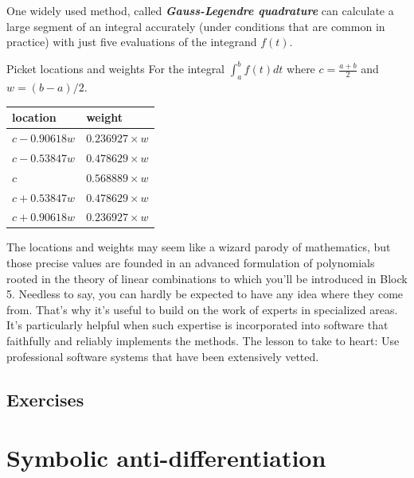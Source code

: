 \documentclass[
  letterpaper,
  DIV=11,
  numbers=noendperiod,
  oneside]{scrreprt}
\begin{document}
One widely used method, called \textbf{\emph{Gauss-Legendre quadrature}}
can calculate a large segment of an integral accurately (under
conditions that are common in practice) with just five evaluations of
the integrand \(f(t)\).

\begin{margintable}

\caption{Picket locations and weights For the integral
\(\int_a^b f(t) dt\) where \(c = \frac{a+b}{2}\) and
\(w = (b-a)/2\).}\begin{minipage}[t]{\linewidth}

{\centering 

\begin{longtable}[]{@{}ll@{}}
\toprule
location & weight \\
\midrule
\endhead
\(c - 0.90618 w\) & \(0.236927 \times w\) \\
\(c - 0.53847 w\) & \(0.478629 \times w\) \\
\(c\) & \(0.568889 \times w\) \\
\(c + 0.53847 w\) & \(0.478629 \times w\) \\
\(c + 0.90618 w\) & \(0.236927 \times w\) \\
\bottomrule
\end{longtable}

}

\end{minipage}%

\end{margintable}

The locations and weights may seem like a wizard parody of mathematics,
but those precise values are founded in an advanced formulation of
polynomials rooted in the theory of linear combinations to which you'll
be introduced in Block 5. Needless to say, you can hardly be expected to
have any idea where they come from. That's why it's useful to build on
the work of experts in specialized areas. It's particularly helpful when
such expertise is incorporated into software that faithfully and
reliably implements the methods. The lesson to take to heart: Use
professional software systems that have been extensively vetted.

\hypertarget{exercises-3}{%
\section{Exercises}\label{exercises-3}}

\hypertarget{sec-accum-symbolic}{%
\chapter{Symbolic anti-differentiation}\label{sec-accum-symbolic}}
\end{document}
